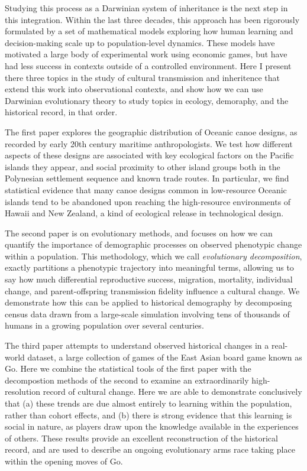 \documentclass[letterpaper, 12pt, oneside]{book}
\begin{document}
Studying this process as a Darwinian system of inheritance is the next step in this integration.  Within the last three decades, this approach has been rigorously formulated by a set of mathematical models exploring how human learning and decision-making scale up to population-level dynamics.  These models have motivated a large body of experimental work using economic games, but have had less success in contexts outside of a controlled environment.  Here I present there three topics in the study of cultural transmission and inheritence that extend this work into observational contexts, and show how we can use Darwinian evolutionary theory to study topics in ecology, demoraphy, and the historical record, in that order.  

The first paper explores the geographic distribution of Oceanic canoe designs, as recorded by early 20th century maritime anthropologists.  We test how different aspects of these designs are associated with key ecological factors on the Pacific islands they appear, and social proximity to other island groups both in the Polynesian settlement sequence and known trade routes.  In particular, we find statistical evidence that many canoe designs common in low-resource Oceanic islands tend to be abandoned upon reaching the high-resource environments of Hawaii and New Zealand, a kind of ecological release in technological design.  

The second paper is on evolutionary methods, and focuses on how we can quantify the importance of demographic processes on observed phenotypic change within a population.  This methodology, which we call \textit{evolutionary decomposition}, exactly partitions a phenotypic trajectory into meaningful terms, allowing us to say how much differential reproductive success, migration, mortality, individual change, and parent-offspring transmission fidelity influence a cultural change.  We demonstrate how this can be applied to historical demography by decomposing census data drawn from a large-scale simulation involving tens of thousands of humans in a growing population over several centuries.

The third paper attempts to understand observed historical changes in a real-world dataset, a large collection of games of the East Asian board game known as Go.  Here we combine the statistical tools of the first paper with the decompostion methods of the second to examine an extraordinarily high-resolution record of cultural change.  Here we are able to demonstrate conclusively that (a) these trends are due almost entirely to learning within the population, rather than cohort effects, and (b) there is strong evidence that this learning is social in nature, as players draw upon the knowledge available in the experiences of others.  These results provide an excellent reconstruction of the historical record, and are used to describe an ongoing evolutionary arms race taking place within the opening moves of Go.  
\end{document}
